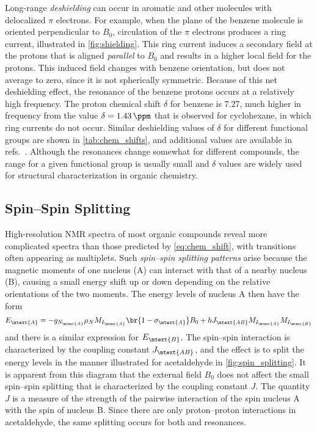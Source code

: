Long-range \emph{deshielding} can occur in aromatic and other molecules with delocalized \( \pi \) electrons. 
For example, when the plane of the benzene molecule is oriented perpendicular to \( B_0 \), circulation of the \( \pi \) electrons produces a ring current, illustrated in \cref{fig:shielding}. 
This ring current induces a secondary field at the protons that is aligned \emph{parallel} to \( B_0 \) and results in a higher local field for the protons. 
This induced field changes with benzene orientation, but does not average to zero, since it is not spherically symmetric. 
Because of this net deshielding effect, the resonance of the benzene protons occurs at a relatively high frequency. 
The proton chemical shift \( \delta  \) for benzene is \qty{7.27}{\ppm}, much higher in frequency from the value \( \delta = \qty{1.43}{\ppm} \) that is observed for cyclohexane, in which ring currents do not occur. 
Similar deshielding values of \( \delta \) for different functional groups are shown in \cref{tab:chem_shifts}, and additional values are available in refs.~\autocite{davis1965advanced,pople1959nmr,silverstein2005spec,sdbs2020,aldrich1993nmr}.
Although the resonances change somewhat for different compounds, the range for a given functional group is usually small and \( \delta \) values are widely used for structural characterization in organic chemistry. 



\subsection{Spin--Spin Splitting} %
\label{sub:spin_spin_splitting}

High-resolution NMR spectra of most organic compounds reveal more complicated spectra than those predicted by \cref{eq:chem_shift}, with transitions often appearing as multiplets.
Such \emph{spin--spin splitting patterns} arise because the magnetic moments of one nucleus (A) can interact with that of a nearby nucleus (B), causing a small energy shift up or down depending on the relative orientations of the two moments. 
The energy levels of nucleus A then have the form 
\begin{equation}
	E_\mtext{A} = -g_{N_\mtext{A}} \mu_N M_{I_\mtext{A}} \br{1-\sigma_\mtext{A}} B_0
		+ h J_\mtext{AB} M_{I_\mtext{A}} M_{I_\mtext{B}}
	\label{eq:j_coupling}
\end{equation}
and there is a similar expression for \( E_\mtext{B} \). 
The spin--spin interaction is characterized by the coupling constant \( J_\mtext{AB} \), and the effect is to split the energy levels in the manner illustrated for acetaldehyde in \cref{fig:spin_splitting}. 
It is apparent from this diagram that the external field \( B_0 \) does not affect the small spin--spin splitting that is characterized by the coupling constant \( J \). 
The quantity \( J \) is a measure of the strength of the pairwise interaction of the spin nucleus A with the spin of nucleus B. 
Since there are only proton--proton interactions in acetaldehyde, the same splitting occurs for both  and  resonances. 

